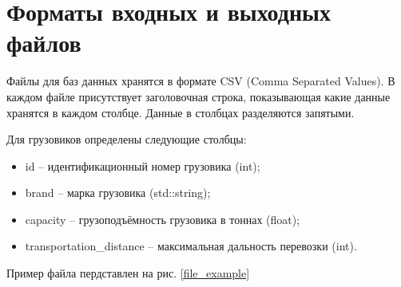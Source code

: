 \section*{Форматы входных и выходных файлов}

Файлы для баз данных хранятся в формате CSV (Comma Separated Values). 
В каждом файле присутствует заголовочная строка, 
показывающая какие данные хранятся в каждом столбце. 
Данные в столбцах разделяются запятыми.

Для грузовиков определены следующие столбцы:
\begin{itemize}
    \item id -- идентификационный номер грузовика (int);
    \item brand -- марка грузовика (std::string);
    \item capacity -- грузоподъёмность грузовика в тоннах (float);
    \item transportation\_distance -- максимальная дальность перевозки (int).
\end{itemize}

Пример файла пердставлен на рис. \ref{file_example}
